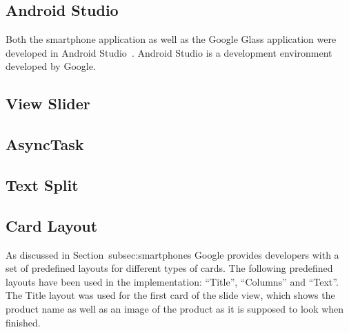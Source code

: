 

\subsection{Android Studio}
Both the smartphone application as well as the Google Glass application were developed in Android Studio~\cite{androidStudio}. Android Studio is a development environment developed by Google. %



\subsection{View Slider}


\subsection{AsyncTask}


\subsection{Text Split}


\subsection{Card Layout}
As discussed in Section~{subsec:smartphones} Google provides developers with a set of predefined layouts for different types of cards. The following predefined layouts have been used in the implementation: ``Title'', ``Columns'' and ``Text''. The Title layout was used for the first card of the slide view, which shows the product name as well as an image of the product as it is supposed to look when finished.

